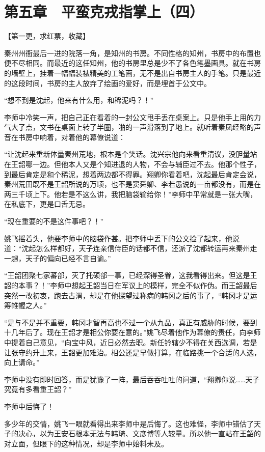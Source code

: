 \section{第五章　平蛮克戎指掌上（四）}

【第一更，求红票，收藏】

秦州州衙最后一进的院落一角，是知州的书房。不同性格的知州，书房中的布置也便不尽相同。而最近的这任知州，他的书房里总是少不了各色笔墨画具。就在书房的墙壁上，挂着一幅幅装裱精美的工笔画，无不是出自书房主人的手笔。只是最近的这段时间，书房的主人放弃了绘画的爱好，而是埋首于公文中。

“想不到是沈起，他来有什么用，和稀泥吗？！”

李师中冷笑一声，把自己正在看着的一封公文甩手丢在桌案上。只是他手上用的力气大了点，文书在桌面上转了半圈，啪的一声滑落到了地上。就听着秦凤经略的声音在书房中响着，对着他的幕僚说道：

“让沈起来重新体量秦州荒地，根本是个笑话。沈兴宗他向来看重清议，没胆量站在王韶哪一边。但他本人又是个知进退的人物，不会与辅臣过不去。他那个性子，到最后肯定是和个稀泥，想着两边都不得罪。翔卿你看着吧，沈起最后肯定会说，秦州荒田既不是王韶所说的万顷，也不是窦舜卿、李若愚说的一亩都没有，而是在两三千顷上下。他若是不这么讲，我把脑袋输给你！”李师中平常就是一张大嘴，在私底下，更是口舌无忌。

“现在重要的不是这件事吧？！”

姚飞摇着头，他要李师中的脑袋作甚。把李师中丢下的公文捡了起来，他说道：“沈起怎么样都好，天子连亲信侍臣的话都不信，还派了沈都转运再来秦州走一趟，天子的偏向已经不言自谕。”

“王韶团聚七家蕃部，灭了托硕部一事，已经深得圣眷，这我看得出来。但这是王韶的本事？！”李师中想起王韶当日在军议上的模样，完全不似作伪。而王韶最后突然一改初衷，跑去古渭，却是在他探望过称病的韩冈之后的事了，“韩冈才是运筹帷幄之人。”

“是与不是并不重要，韩冈才智再高也不过一个从九品，真正有威胁的时候，要到十几年后了。现在王韶才是相公你要在意的。”姚飞尽着他作为幕僚的责任，向李师中提着自己意见，“向宝中风，近日必然去职。新任钤辖少不得在关西选调，若是让张守约升上来，王韶更加难治。相公还是早做打算，在临路挑一个合适的人选，向上请命。”

李师中没有即时回答，而是犹豫了一阵，最后吞吞吐吐的问道，“翔卿你说……天子究竟有多看重王韶？”

李师中后悔了！

多少年的交情，姚飞一眼就看得出来李师中是后悔了。这也难怪，李师中错估了天子的决心，以为王安石根本无法与韩琦、文彦博等人较量。所以他一直站在王韶的对立面，但眼下的这种情况，却是李师中始料未及。

